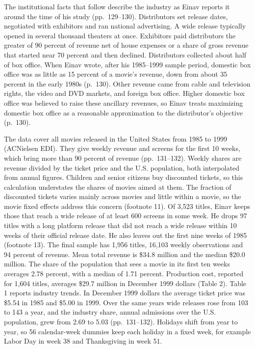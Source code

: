 The institutional facts that follow describe the industry as Einav reports it around the time of his study
(pp.~129--130). Distributors set release dates, negotiated with exhibitors and ran national advertising. A wide
release typically opened in several thousand theaters at once. Exhibitors paid distributors the greater of 90
percent of revenue net of house expenses or a share of gross revenue that started near 70 percent and then
declined. Distributors collected about half of box office. When Einav wrote, after his 1985--1999 sample period,
domestic box office was as little as 15 percent of a movie's revenue, down from about 35 percent in the early 1980s
(p.~130). Other revenue came from cable and television rights, the video and DVD markets, and foreign box office. Higher
domestic box office was believed to raise these ancillary revenues, so Einav treats maximizing domestic box office as a reasonable approximation to the
distributor's objective (p.~130).

The data cover all movies released in the United States from 1985 to 1999 (ACNielsen EDI). They give weekly
revenue and screens for the first 10 weeks, which bring more than 90 percent of revenue (pp.~131--132). Weekly shares are
revenue divided by the ticket price and the U.S. population, both interpolated from annual figures. Children and
senior citizens buy discounted tickets, so this calculation understates the shares of movies aimed at them. The
fraction of discounted tickets varies mainly across movies and little within a movie, so the movie fixed effects
address this concern (footnote 11). Of 3,523
titles, Einav keeps those that reach a wide release of at least 600 screens in some week. He drops 97 titles
with a long platform release that did not reach a wide release within 10 weeks of their official release date.
He also leaves out the first nine weeks of 1985 (footnote 13). The final sample has 1,956 titles, 16,103 weekly
observations and 94 percent of revenue. Mean total revenue is \$34.8 million and the median \$20.0 million. The
share of the population that sees a movie in its first ten weeks averages 2.78 percent, with a median of 1.71
percent. Production cost, reported for 1,604 titles, averages \$29.7 million in December 1999 dollars (Table 2).
Table 1 reports industry trends. In December 1999 dollars the average ticket price was \$5.54 in 1985 and \$5.00 in
1999. Over the same years wide releases rose from 103 to 143 a year, and the industry share, annual admissions over
the U.S. population, grew from 2.69 to 5.03 (pp.~131--132). Holidays
shift from year to year, so 56 calendar-week dummies keep each holiday in a fixed week, for example Labor Day in
week 38 and Thanksgiving in week 51.

